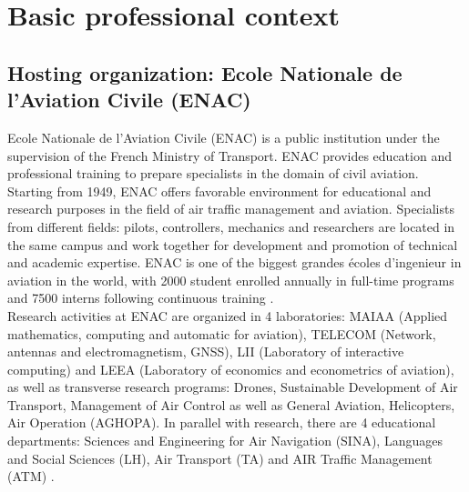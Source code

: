 \documentclass[titlepage, 11pt]{article}
\begin{document}
\newpage 
\section{Basic professional context}\label{profcontext}
\subsection{Hosting organization: Ecole Nationale de l'Aviation Civile (ENAC)}
\doublespacing 
\tab Ecole Nationale de l'Aviation Civile (ENAC) is a public institution under the supervision of the French Ministry of Transport. ENAC provides education and professional training to prepare specialists in the domain of civil aviation. Starting from 1949, ENAC offers favorable environment for educational and research purposes in the field of air traffic management and aviation. Specialists from different fields: pilots, controllers, mechanics and researchers are located in the same campus and work together for development and promotion of technical and academic expertise. ENAC is one of the biggest grandes écoles d'ingenieur in aviation in the world, with 2000 student enrolled annually in full-time programs and 7500 interns following continuous training \cite{ENAC}.\\ 
\tab Research activities at ENAC are organized in 4 laboratories: MAIAA (Applied mathematics, computing and automatic for  aviation), TELECOM (Network, antennas and electromagnetism, GNSS), LII (Laboratory of interactive computing) and LEEA (Laboratory of economics and econometrics of aviation), as well as transverse research programs: Drones, Sustainable Development of Air Transport, Management of Air Control as well as General Aviation, Helicopters, Air Operation (AGHOPA). In parallel with research, there are 4 educational departments: Sciences and Engineering for Air Navigation (SINA), Languages and Social Sciences (LH), Air Transport (TA) and AIR Traffic Management (ATM) \cite{ENAC}.
\end{document}
